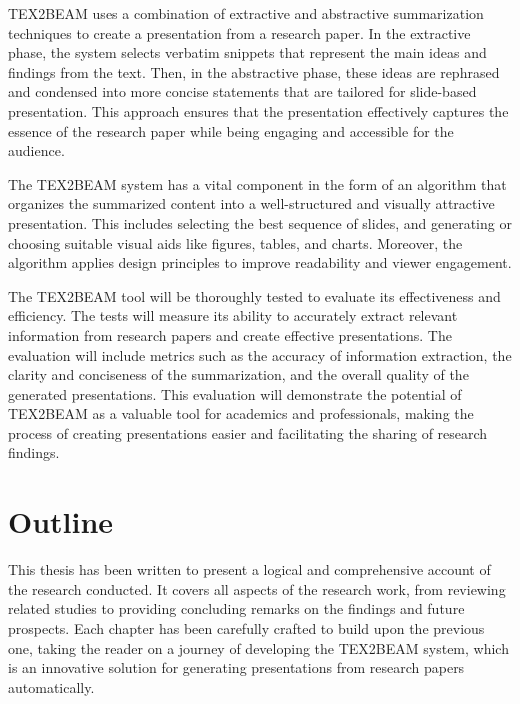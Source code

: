 TEX2BEAM uses a combination of extractive and abstractive summarization techniques to create a presentation from a research paper. In the extractive phase, the system selects verbatim snippets that represent the main ideas and findings from the text. Then, in the abstractive phase, these ideas are rephrased and condensed into more concise statements that are tailored for slide-based presentation. This approach ensures that the presentation effectively captures the essence of the research paper while being engaging and accessible for the audience.

The TEX2BEAM system has a vital component in the form of an algorithm that organizes the summarized content into a well-structured and visually attractive presentation. This includes selecting the best sequence of slides, and generating or choosing suitable visual aids like figures, tables, and charts. Moreover, the algorithm applies design principles to improve readability and viewer engagement.

The TEX2BEAM tool will be thoroughly tested to evaluate its effectiveness and efficiency. The tests will measure its ability to accurately extract relevant information from research papers and create effective presentations. The evaluation will include metrics such as the accuracy of information extraction, the clarity and conciseness of the summarization, and the overall quality of the generated presentations. This evaluation will demonstrate the potential of TEX2BEAM as a valuable tool for academics and professionals, making the process of creating presentations easier and facilitating the sharing of research findings.


\section{Outline}
\label{sec:intro:outline}


This thesis has been written to present a logical and comprehensive account of the research conducted. It covers all aspects of the research work, from reviewing related studies to providing concluding remarks on the findings and future prospects. Each chapter has been carefully crafted to build upon the previous one, taking the reader on a journey of developing the TEX2BEAM system, which is an innovative solution for generating presentations from research papers automatically.

